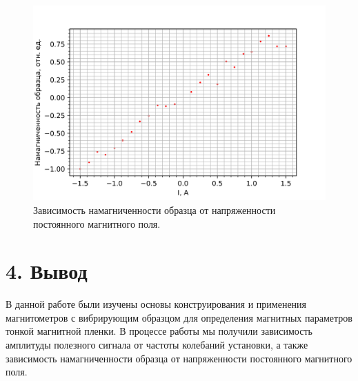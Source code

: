 \documentclass[a4paper,12pt]{report}
\begin{document}
\begin{figure}[H]
    \centering
    \includegraphics[width=0.6\linewidth]{Am(I)_Kate.png}
    \caption{Зависимость намагниченности образца от напряженности постоянного магнитного поля.} \label{mu}
\end{figure}

\section*{4. Вывод}

В данной работе были изучены основы конструирования и применения магнитометров с вибрирующим образцом для определения магнитных параметров тонкой магнитной пленки. В процессе работы мы получили зависимость амплитуды полезного сигнала от частоты колебаний установки, а также зависимость намагниченности образца от напряженности постоянного магнитного поля.
\end{document}
